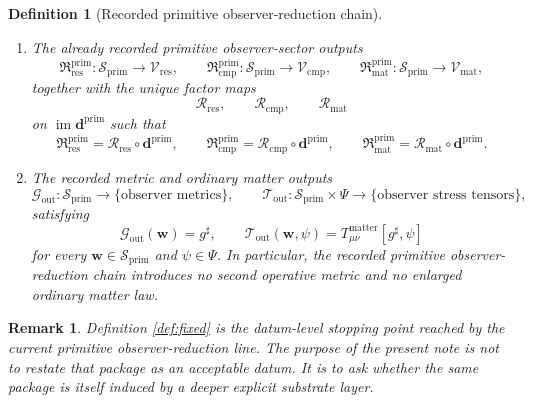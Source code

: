 \documentclass[11pt]{article}
\newcommand{\CompletedMetric}{g^{\sharp}}
\newcommand{\Car}{\mathrm{car}}
\newcommand{\Cur}{\mathrm{cur}}
\newcommand{\Hom}{\mathrm{hom}}
\newcommand{\PrimShell}{\mathcal S_{\mathrm{prim}}}
\newcommand{\PrimTheta}[1]{\Theta_{#1}^{\mathrm{prim}}}
\newcommand{\EqProj}[1]{P_{#1}^{\mathrm{eq}}}
\newcommand{\PrimDefectTuple}{\mathbf d^{\mathrm{prim}}}
\newcommand{\PrimResidualSector}{\mathfrak R_{\mathrm{res}}^{\mathrm{prim}}}
\newcommand{\PrimCompletionSector}{\mathfrak R_{\mathrm{cmp}}^{\mathrm{prim}}}
\newcommand{\PrimMatterSector}{\mathfrak R_{\mathrm{mat}}^{\mathrm{prim}}}
\newcommand{\ResidualRead}{\mathscr R_{\mathrm{res}}}
\newcommand{\CompletionRead}{\mathscr R_{\mathrm{cmp}}}
\newcommand{\MatterRead}{\mathscr R_{\mathrm{mat}}}
\newcommand{\MetricOut}{\mathscr G_{\mathrm{out}}}
\newcommand{\MatterOut}{\mathscr T_{\mathrm{out}}}
\newtheorem{definition}{Definition}
\newtheorem{remark}{Remark}
\begin{document}
\begin{definition}[Recorded primitive observer-reduction chain]
\begin{enumerate}
\begin{equation}
\begin{aligned}
    \\
    &(\mathbf 1-\EqProj{\Car})\PrimTheta{\Car}(w_{\Car}),
    (\mathbf 1-\EqProj{\Cur})\PrimTheta{\Cur}(w_{\Cur}),
    \\
    &
    (\mathbf 1-\EqProj{\Hom})\PrimTheta{\Hom}(w_{\Hom})
    \Bigr).
    \end{aligned}
    \label{eq:primtuple}
    \end{equation}
    \item The already recorded primitive observer-sector outputs
    \[
    \PrimResidualSector:\PrimShell\to\mathcal V_{\mathrm{res}},
    \qquad
    \PrimCompletionSector:\PrimShell\to\mathcal V_{\mathrm{cmp}},
    \qquad
    \PrimMatterSector:\PrimShell\to\mathcal V_{\mathrm{mat}},
    \]
    together with the unique factor maps
    \[
    \ResidualRead,\qquad
    \CompletionRead,\qquad
    \MatterRead
    \]
    on \(\operatorname{im}\PrimDefectTuple\) such that
    \begin{equation}
    \PrimResidualSector=\ResidualRead\circ\PrimDefectTuple,\qquad
    \PrimCompletionSector=\CompletionRead\circ\PrimDefectTuple,\qquad
    \PrimMatterSector=\MatterRead\circ\PrimDefectTuple.
    \label{eq:sectorfactor}
    \end{equation}
    \item The recorded metric and ordinary matter outputs
    \[
    \MetricOut:\PrimShell\to\{\text{observer metrics}\},
    \qquad
    \MatterOut:\PrimShell\times\Psi\to\{\text{observer stress tensors}\},
    \]
    satisfying
    \begin{equation}
    \MetricOut(\mathbf w)=\CompletedMetric,
    \qquad
    \MatterOut(\mathbf w,\psi)
    =
    T_{\mu\nu}^{\mathrm{matter}}[\CompletedMetric,\psi]
    \label{eq:fixedoutputs}
    \end{equation}
    for every \(\mathbf w\in\PrimShell\) and \(\psi\in\Psi\). In particular, the recorded primitive observer-reduction chain introduces no second operative metric and no enlarged ordinary matter law.
\end{enumerate}
\end{definition}

\begin{remark}
Definition \ref{def:fixed} is the datum-level stopping point reached by the current primitive observer-reduction line. The purpose of the present note is not to restate that package as an acceptable datum. It is to ask whether the same package is itself induced by a deeper explicit substrate layer.
\end{remark}
\end{document}
